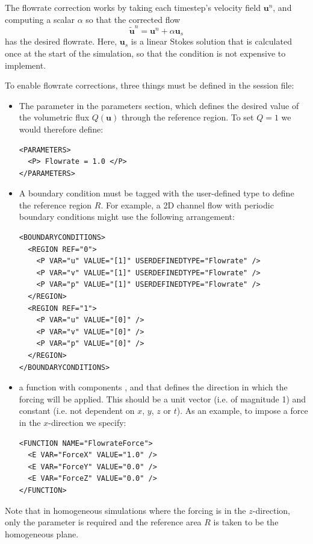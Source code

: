 The flowrate correction works by taking each timestep's velocity field
$\mathbf{u}^{n}$, and computing a scalar $\alpha$ so that the corrected flow
%
\[
  \tilde{\mathbf{u}}^n = \mathbf{u}^n + \alpha\mathbf{u}_s
\]
has the desired flowrate. Here, $\mathbf{u}_s$ is a linear Stokes solution that
is calculated once at the start of the simulation, so that the condition is not
expensive to implement.

To enable flowrate corrections, three things must be defined in the session
file:

\begin{itemize}
  \item The  parameter in the parameters section, which defines
  the desired value of the volumetric flux $Q(\mathbf{u})$ through the reference
  region. To set $Q = 1$ we would therefore define:
\begin{lstlisting}[style=XMLStyle]
<PARAMETERS>
  <P> Flowrate = 1.0 </P>
</PARAMETERS>
\end{lstlisting}
  \item A boundary condition must be tagged with the 
  user-defined type to define the reference region $R$. For example, a 2D
  channel flow with periodic boundary conditions might use the following
  arrangement:
\begin{lstlisting}[style=XMLStyle]
<BOUNDARYCONDITIONS>
  <REGION REF="0">
    <P VAR="u" VALUE="[1]" USERDEFINEDTYPE="Flowrate" />
    <P VAR="v" VALUE="[1]" USERDEFINEDTYPE="Flowrate" />
    <P VAR="p" VALUE="[1]" USERDEFINEDTYPE="Flowrate" />
  </REGION>
  <REGION REF="1">
    <P VAR="u" VALUE="[0]" />
    <P VAR="v" VALUE="[0]" />
    <P VAR="p" VALUE="[0]" />
  </REGION>
</BOUNDARYCONDITIONS>
\end{lstlisting}
  \item a  function with components ,
   and  that defines the direction in which the
  forcing will be applied. This should be a unit vector (i.e. of magnitude 1)
  and constant (i.e. not dependent on $x$, $y$, $z$ or $t$). As an example, to
  impose a force in the $x$-direction we specify:
\begin{lstlisting}[style=XMLStyle]
<FUNCTION NAME="FlowrateForce">
  <E VAR="ForceX" VALUE="1.0" />
  <E VAR="ForceY" VALUE="0.0" />
  <E VAR="ForceZ" VALUE="0.0" />
</FUNCTION>
\end{lstlisting}
\end{itemize}

Note that in homogeneous simulations where the forcing is in the $z$-direction,
only the  parameter is required and the reference area $R$ is
taken to be the homogeneous plane.


